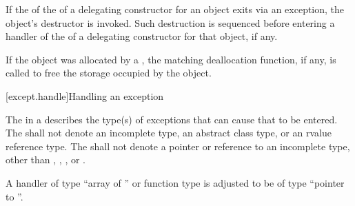 \pnum
If the 
of the 
of a delegating constructor
for an object exits via
an exception, the object's destructor is invoked.
Such destruction is sequenced before entering a handler of the
 of a delegating constructor for that object, if any.

\pnum
\begin{note}
If the object was allocated by a ,
the matching deallocation function,
if any, is called to free the storage occupied by the object.
\end{note}


[except.handle]{Handling an exception}
%

\pnum
The
in a
describes the type(s) of exceptions that can cause
that
to be entered.
%
%
%
%
The
shall not denote an incomplete type, an abstract class type, or an rvalue reference type.
The
shall not denote a pointer or reference to an
incomplete type, other than
,
,
,
or
.

\pnum
A handler of type
%
``array of '' or
%
function type 
is adjusted to be of type
``pointer to ''.

